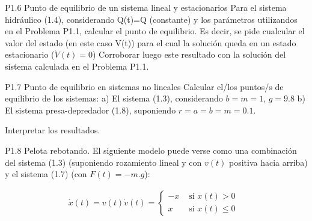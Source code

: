 \documentclass{article}
\begin{document}
P1.6 Punto de equilibrio de un sistema lineal y estacionarios Para el sistema hidráulico (1.4), considerando Q(t)=Q (constante) y los parámetros utilizandos en el Problema P1.1, calcular el punto de equilibrio. Es decir, se pide cualcular el valor del estado (en este caso V(t)) para el cual la solución queda en un estado estacionario ($\dot{V}(t)=0$)
Corroborar luego este resultado con la solución del sistema calculada en el Problema P1.1.

P1.7 Punto de equilibrio en sistemas no lineales Calcular el/los puntos/s de equilibrio de los sistemas:
a) El sistema (1.3), considerando $b=m=1$, $g=9.8$
b) El sistema presa-depredador (1.8), suponiendo $r=a=b=m=0.1$. 

Interpretar los resultados.

P1.8 Pelota rebotando. El siguiente modelo puede verse como una combinación del sistema (1.3) (suponiendo rozamiento lineal y con $v(t)$ positiva hacia arriba) y el sistema (1.7) (con $F(t)=-m.g$):

\begin{eqnarray}
\dot{x}(t) = v(t)
\dot{v}(t) = \left\{ \begin{array}{rl}
 -x &\mbox{ si $x(t) > 0$} \\
  x &\mbox{ si $x(t) \leq 0$ }
       \end{array} \right .
\end{eqnarray}
\end{document}

